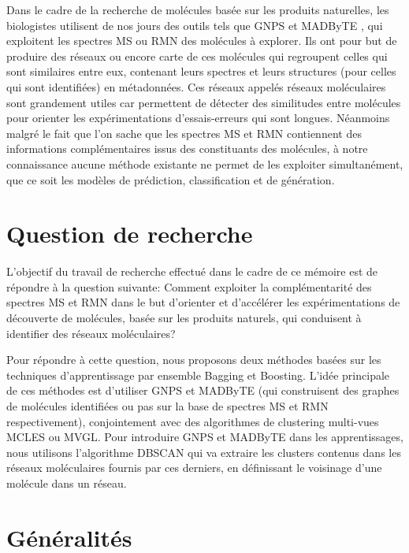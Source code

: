 Dans le cadre de la recherche de molécules basée sur les produits naturelles, les biologistes utilisent de nos jours des outils tels que GNPS \cite{wang2016sharing} et MADByTE \cite{egan2021development}, qui exploitent les spectres MS ou RMN des molécules à explorer.
Ils ont pour but de produire des réseaux ou encore carte de ces molécules qui regroupent celles qui sont similaires entre eux, contenant leurs spectres et leurs structures (pour celles qui sont identifiées) en métadonnées.
Ces réseaux appelés réseaux moléculaires sont grandement utiles car permettent de détecter des similitudes entre molécules pour orienter les expérimentations d'essais-erreurs qui sont longues.
Néanmoins malgré le fait que l'on sache que les spectres MS et RMN contiennent des informations complémentaires issus des constituants des molécules, à notre connaissance aucune méthode existante ne permet de les exploiter simultanément, que ce soit les modèles de prédiction, classification et de génération.

\section{Question de recherche}
L'objectif du travail de recherche effectué dans le cadre de ce mémoire est de répondre à la question suivante:
Comment exploiter la complémentarité des spectres MS et RMN dans le but d'orienter et d'accélérer les expérimentations de découverte de molécules, basée sur les produits naturels, qui conduisent à identifier des réseaux moléculaires?

Pour répondre à cette question, nous proposons deux méthodes basées sur les techniques d'apprentissage par ensemble Bagging et Boosting. L'idée principale de ces méthodes est d'utiliser GNPS et MADByTE (qui construisent des graphes de molécules identifiées ou pas sur la base de spectres MS et RMN respectivement), conjointement avec des algorithmes de clustering multi-vues MCLES ou MVGL. Pour introduire GNPS et MADByTE dans les apprentissages, nous utilisons l'algorithme DBSCAN qui va extraire les clusters contenus dans les réseaux moléculaires fournis par ces derniers, en définissant le voisinage d'une molécule dans un réseau.

\section{Généralités}
